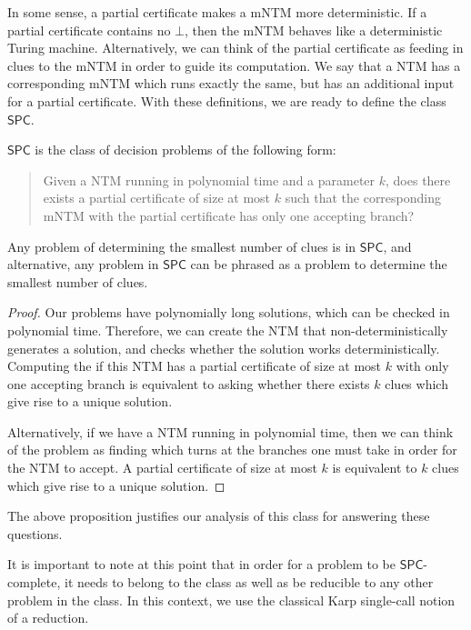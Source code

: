 \documentclass[runningheads,a4paper]{llncs}
\begin{document}
In some sense, a partial certificate makes a mNTM more deterministic. If a partial certificate contains no $\bot$, then the mNTM behaves like a deterministic Turing machine. Alternatively, we can think of the partial certificate as feeding in clues to the mNTM in order to guide its computation. We say that a NTM has a corresponding mNTM which runs exactly the same, but has an additional input for a partial certificate. With these definitions, we are ready to define the class $\mathsf{SPC}$.

\begin{definition}
$\mathsf{SPC}$ is the class of decision problems of the following form:\\
\begin{quote}
Given a NTM running in polynomial time and a parameter $k$, does there exists a partial certificate of size at most $k$ such that the corresponding mNTM with the partial certificate has only one accepting branch?
\end{quote}
\end{definition}

\begin{proposition}
Any problem of determining the smallest number of clues is in $\mathsf{SPC}$, and alternative, any problem in $\mathsf{SPC}$ can be phrased as a problem to determine the smallest number of clues.
\end{proposition}

\begin{proof}
Our problems have polynomially long solutions, which can be checked in polynomial time. Therefore, we can create the NTM that non-deterministically generates a solution, and checks whether the solution works deterministically. Computing the if this NTM has a partial certificate of size at most $k$ with only one accepting branch is equivalent to asking whether there exists $k$ clues which give rise to a unique solution. 

Alternatively, if we have a NTM running in polynomial time, then we can think of the problem as finding which turns at the branches one must take in order for the NTM to accept. A partial certificate of size at most $k$ is equivalent to $k$ clues which give rise to a unique solution.
\end{proof}

The above proposition justifies our analysis of this class for answering these questions.

It is important to note at this point that in order for a problem to be $\mathsf{SPC}$-complete, it needs to belong to the class as well as be reducible to any other problem in the class. In this context, we use the classical Karp single-call notion of a reduction. 
\end{document}
